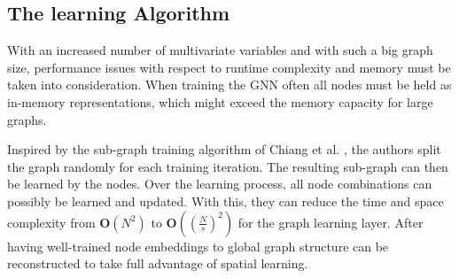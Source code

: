 \documentclass[letterpaper,twocolumn,11pt]{article}
\begin{document}
    \subsection{The learning Algorithm}
    With an increased number of multivariate variables and with such a big graph size,
    performance issues with respect to runtime complexity and memory must be taken into consideration.
    When training the GNN often all nodes must be held as in-memory representations, which might exceed the memory capacity for large graphs.

    Inspired by the sub-graph training algorithm of Chiang et al. \cite{chiang2019cluster}, the authors split the graph
    randomly for each training iteration.
    The resulting sub-graph can then be learned by the nodes.
    Over the learning process, all node combinations can possibly be learned and updated.
    With this, they can reduce the time and space complexity from $\mathbf{O}(N^2)$ to $\mathbf{O}\left((\frac{N}{s})^2\right)$ for the graph learning layer.
    After having well-trained node embeddings to global graph structure can be reconstructed to take full advantage of spatial learning.
\end{document}
